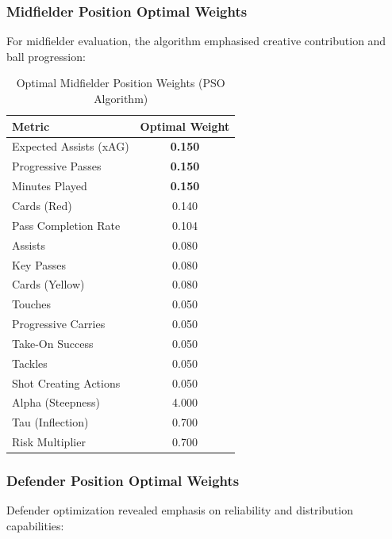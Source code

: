 \subsubsection{Midfielder Position Optimal Weights}

For midfielder evaluation, the algorithm emphasised creative contribution and ball progression:

\begin{table}[H]
\centering
\caption{Optimal Midfielder Position Weights (PSO Algorithm)}
\label{tab:midfielder_weights}
\begin{tabular}{lc}
\toprule
\textbf{Metric} & \textbf{Optimal Weight} \\
\midrule
Expected Assists (xAG) & \textbf{0.150} \\
Progressive Passes & \textbf{0.150} \\
Minutes Played & \textbf{0.150} \\
Cards (Red) & 0.140 \\
Pass Completion Rate & 0.104 \\
Assists & 0.080 \\
Key Passes & 0.080 \\
Cards (Yellow) & 0.080 \\
Touches & 0.050 \\
Progressive Carries & 0.050 \\
Take-On Success & 0.050 \\
Tackles & 0.050 \\
Shot Creating Actions & 0.050 \\
\midrule
Alpha (Steepness) & 4.000 \\
Tau (Inflection) & 0.700 \\
Risk Multiplier & 0.700 \\
\bottomrule
\end{tabular}
\end{table}

\subsubsection{Defender Position Optimal Weights}

Defender optimization revealed emphasis on reliability and distribution capabilities:

